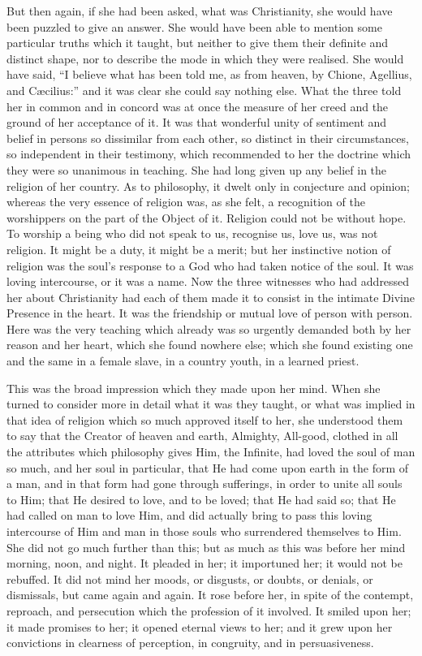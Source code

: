 But then again, if she had been asked, what was Christianity, she
would have been puzzled to give an answer. She would have been able to
mention some particular truths which it taught, but neither to give
them their definite and distinct shape, nor to describe the mode in
which they were realised. She would have said, ``I believe what
has been told me, as from heaven, by Chione, Agellius, and Cæcilius:''
and it was clear she could say nothing else. What the three told her
in common and in concord was at once the measure of her creed and the
ground of her acceptance of it. It was that wonderful unity of
sentiment and belief in persons so dissimilar from each other, so
distinct in their circumstances, so independent in their
testimony, which recommended to her the doctrine which they were so
unanimous in teaching. She had long given up any belief in the
religion of her country. As to philosophy, it dwelt only in conjecture
and opinion; whereas the very essence of religion was, as she felt, a
recognition of the worshippers on the part of the Object of it.
Religion could not be without hope. To worship a being who did not
speak to us, recognise us, love us, was not religion. It might be a
duty, it might be a merit; but her instinctive notion of religion was
the soul's response to a God who had taken notice of the soul. It was
loving intercourse, or it was a name. Now the three witnesses who had
addressed her about Christianity had each of them made it to consist
in the intimate Divine Presence in the heart. It was the friendship or
mutual love of person with person. Here was the very teaching which
already was so urgently demanded both by her reason and her heart,
which she found nowhere else; which she found existing one and the
same in a female slave, in a country youth, in a learned priest.

This was the broad impression which they made upon her mind. When
she turned to consider more in detail what it was they taught, or what
was implied in that idea of religion which so much approved itself to
her, she understood them to say that the Creator of heaven and earth,
Almighty, All-good, clothed in all the attributes which philosophy
gives Him, the Infinite, had loved the soul of man so much, and her
soul in particular, that He had come upon earth in the form of a
man, and in that form had gone through sufferings, in order to unite
all souls to Him; that He desired to love, and to be loved; that He
had said so; that He had called on man to love Him, and did actually
bring to pass this loving intercourse of Him and man in those souls
who surrendered themselves to Him. She did not go much further than
this; but as much as this was before her mind morning, noon, and
night. It pleaded in her; it importuned her; it would not be rebuffed.
It did not mind her moods, or disgusts, or doubts, or denials, or
dismissals, but came again and again. It rose before her, in spite of
the contempt, reproach, and persecution which the profession of it
involved. It smiled upon her; it made promises to her; it opened
eternal views to her; and it grew upon her convictions in clearness of
perception, in congruity, and in persuasiveness.

